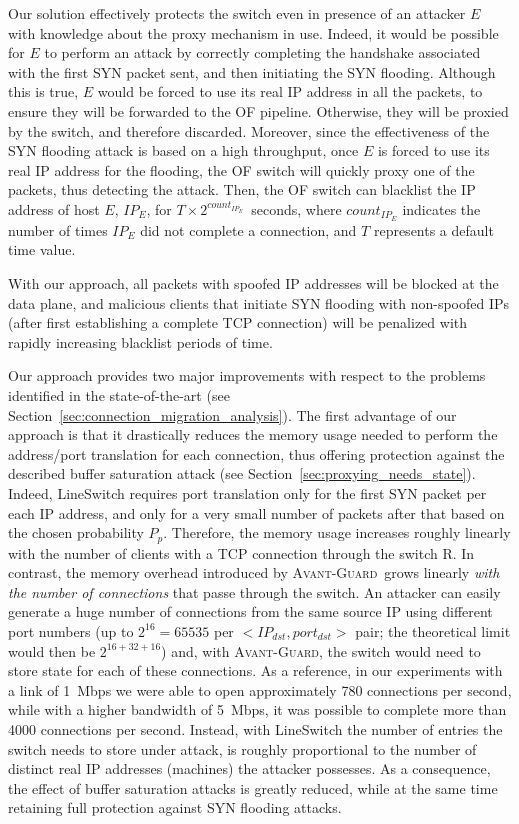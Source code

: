 \documentclass{sig-alternate}
\newcommand{\avantguard}{\textsc{Avant-Guard}}
\begin{document}
Our solution effectively protects the switch even in presence of an attacker $E$ with knowledge about the proxy mechanism in use.
Indeed, it would be possible for $E$ to perform an attack by correctly completing the handshake associated with the first SYN packet sent, and then initiating the SYN flooding.
Although this is true, $E$ would be forced to use its real IP address in all the packets, to ensure they will be forwarded to the OF pipeline. 
Otherwise, they will be proxied by the switch, and therefore discarded.
Moreover, since the effectiveness of the SYN flooding attack is based on a high throughput, 
once $E$ is forced to use its real IP address for the flooding, 
the OF switch will quickly proxy one of the packets, thus detecting the attack.
Then, the OF switch can blacklist the IP address of host $E$, $IP_E$, for $T\times2^{count_{IP_E}}$~seconds, where $count_{IP_E}$ indicates the number of times $IP_E$ did not complete a connection, and $T$ represents a default time value.
	
With our approach, all packets with spoofed IP addresses will be blocked at the data plane, 
and malicious clients that initiate SYN flooding with non-spoofed IPs (after first establishing a complete TCP connection) 
will be penalized with rapidly increasing blacklist periods of time. 

Our approach provides two major improvements with respect to the problems identified 
in the state-of-the-art (see Section~\ref{sec:connection_migration_analysis}).
The first advantage of our approach is that it drastically reduces the memory usage needed to perform the address/port translation for each connection, 
thus offering protection against the described buffer saturation attack (see Section~\ref{sec:proxying_needs_state}).
Indeed, LineSwitch requires port translation only for the first SYN packet per each IP address, and only for a very small number of packets after that based on the chosen probability $P_p$. Therefore, the memory usage increases roughly linearly with the number of clients with a TCP connection through the switch R. In contrast, the memory overhead introduced by \avantguard~grows linearly {\em with the number of connections} that passe through the switch.
An attacker can easily generate a huge number of connections from the same source IP using different port numbers (up to $2^{16}=65535$ per $<IP_{dst}, port_{dst}>$ pair; the theoretical limit would then be $2^{16+32+16}$) and, with \avantguard, the switch would need to store state for each of these connections. 
As a reference, in our experiments with a link of 1~Mbps we were able to open approximately 780 connections per second, while with a higher bandwidth of 5~Mbps, it was possible to complete more than 4000 connections per second.
Instead, with LineSwitch the number of entries the switch needs to store under attack, is roughly proportional to the number of distinct real IP addresses (machines) the attacker possesses. As a consequence, the effect of buffer saturation attacks is greatly reduced, while at the same time retaining full protection against SYN flooding attacks.
\end{document}
